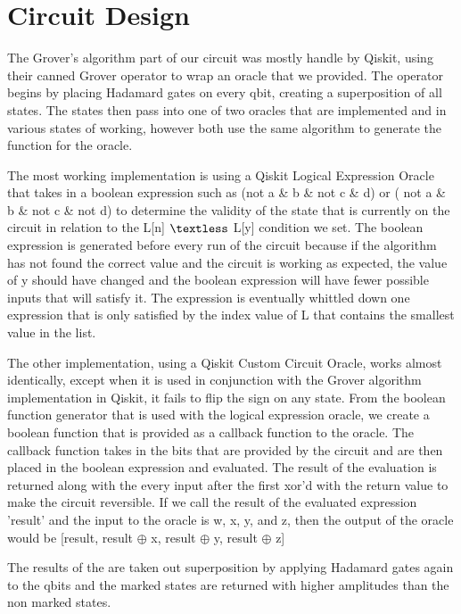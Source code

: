 \documentclass[11pt]{article}
\begin{document}
\section{Circuit Design}

The Grover's algorithm part of our circuit was mostly handle by Qiskit, using their canned Grover operator to wrap an oracle that we provided. The operator begins by placing Hadamard gates on every qbit, creating a superposition of all states. The states then pass into one of two oracles that are implemented and in various states of working, however both use the same algorithm to generate the function for the oracle.

The most working implementation is using a Qiskit Logical Expression Oracle that takes in a boolean expression such as
(not a \& b \& not c \& d) or ( not a \& b \& not c \& not d)
to determine the validity of the state that is currently on the circuit in relation to the L[n] $\textless$ L[y] condition we set. The boolean expression is generated before every run of the circuit because if the algorithm has not found the correct value and the circuit is working as expected, the value of y should have changed and the boolean expression will have fewer possible inputs that will satisfy it. The expression is eventually whittled down one expression that is only satisfied by the index value of L that contains the smallest value in the list.

The other implementation, using a Qiskit Custom Circuit Oracle, works almost identically, except when it is used in conjunction with the Grover algorithm implementation in Qiskit, it fails to flip the sign on any state. From the boolean function generator that is used with the logical expression oracle, we create a boolean function that is provided as a callback function to the oracle. The callback function takes in the bits that are provided by the circuit and are then placed in the boolean expression and evaluated. The result of the evaluation is returned along with the every input after the first xor'd with the return value to make the circuit reversible. If we call the result of the evaluated expression 'result' and the input to the oracle is w, x, y, and z, then the output of the oracle would be [result, result $\oplus$ x, result $\oplus$ y, result $\oplus$ z]

The results of the are taken out superposition by applying Hadamard gates again to the qbits and the marked states are returned with higher amplitudes than the non marked states.
\end{document}
